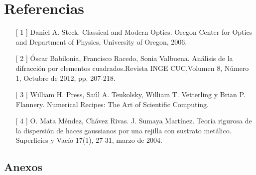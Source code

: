 \documentclass[11pt,letterpaper,twocolumn]{article}
\begin{document}
\section*{Referencias} 
\begin{itemize} 
\item[[ 1]] Daniel A. Steck. Classical and Modern Optics. Oregon Center for Optics and Department of Physics, University of Oregon, 2006. 
\item[[ 2]] Óscar Babilonia, Francisco Racedo, Sonia Valbuena. Análisis de la difracción por elementos cuadrados.Revista INGE CUC,Volumen 8, Número 1, Octubre de 2012, pp. 207-218.

\item[[ 3]]  William H. Press, Saúl A. Teukolsky, William T. Vetterling y Brian P. Flannery. Numerical Recipes: The Art of Scientific Computing. 

\item[[ 4]] O. Mata Méndez, Chávez Rivas. J. Sumaya Martínez. Teoría rigurosa de la dispersión de haces gaussianos por una rejilla con sustrato metálico. Superficies y Vacío 17(1), 27-31, marzo de 2004. 
\end{itemize}
\subsection*{Anexos}
\end{document}
